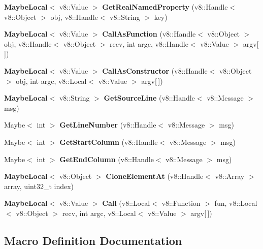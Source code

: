 \begin{DoxyCompactItemize}
\item 
\textbf{ Maybe\+Local}$<$ v8\+::\+Value $>$ \textbf{ Get\+Real\+Named\+Property} (v8\+::\+Handle$<$ v8\+::\+Object $>$ obj, v8\+::\+Handle$<$ v8\+::\+String $>$ key)
\item 
\textbf{ Maybe\+Local}$<$ v8\+::\+Value $>$ \textbf{ Call\+As\+Function} (v8\+::\+Handle$<$ v8\+::\+Object $>$ obj, v8\+::\+Handle$<$ v8\+::\+Object $>$ recv, int argc, v8\+::\+Handle$<$ v8\+::\+Value $>$ argv[$\,$])
\item 
\textbf{ Maybe\+Local}$<$ v8\+::\+Value $>$ \textbf{ Call\+As\+Constructor} (v8\+::\+Handle$<$ v8\+::\+Object $>$ obj, int argc, v8\+::\+Local$<$ v8\+::\+Value $>$ argv[$\,$])
\item 
\textbf{ Maybe\+Local}$<$ v8\+::\+String $>$ \textbf{ Get\+Source\+Line} (v8\+::\+Handle$<$ v8\+::\+Message $>$ msg)
\item 
Maybe$<$ int $>$ \textbf{ Get\+Line\+Number} (v8\+::\+Handle$<$ v8\+::\+Message $>$ msg)
\item 
Maybe$<$ int $>$ \textbf{ Get\+Start\+Column} (v8\+::\+Handle$<$ v8\+::\+Message $>$ msg)
\item 
Maybe$<$ int $>$ \textbf{ Get\+End\+Column} (v8\+::\+Handle$<$ v8\+::\+Message $>$ msg)
\item 
\textbf{ Maybe\+Local}$<$ v8\+::\+Object $>$ \textbf{ Clone\+Element\+At} (v8\+::\+Handle$<$ v8\+::\+Array $>$ array, uint32\+\_\+t index)
\item 
\textbf{ Maybe\+Local}$<$ v8\+::\+Value $>$ \textbf{ Call} (v8\+::\+Local$<$ v8\+::\+Function $>$ fun, v8\+::\+Local$<$ v8\+::\+Object $>$ recv, int argc, v8\+::\+Local$<$ v8\+::\+Value $>$ argv[$\,$])
\end{DoxyCompactItemize}


\subsection{Macro Definition Documentation}
\mbox{\label{nan_8h_ae616f2de329899dcfa607bc3788e69e5}} 
